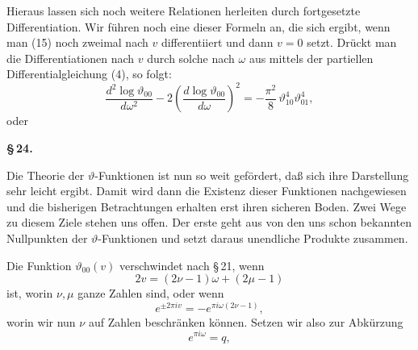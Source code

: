 
Hieraus lassen sich noch weitere Relationen herleiten durch fortgesetzte Differentiation. Wir führen noch eine dieser Formeln an, die sich ergibt, wenn man (15) noch zweimal nach $v$ differentiiert und dann $v=0$ setzt. Drückt man die Differentiationen nach $v$ durch solche nach $\omega$ aus mittels der partiellen Differentialgleichung (4), so folgt:
\[
\frac{d^2\log\vartheta_{00}}{d\omega^2} - 2\left(\frac{d\log\vartheta_{00}}{d\omega}\right)^2 = -\frac{\pi^2}{8}\,\vartheta_{10}^4\vartheta_{01}^4,
\]
oder

\begin{center}
\textbf{\S\,24. }\\
\textbf{}
\end{center}

Die Theorie der $\vartheta$-Funktionen ist nun so weit gefördert, daß sich ihre Darstellung sehr leicht ergibt. Damit wird dann die Existenz dieser Funktionen nachgewiesen und die bisherigen Betrachtungen erhalten erst ihren sicheren Boden. Zwei Wege zu diesem Ziele stehen uns offen. Der erste geht aus von den uns schon bekannten Nullpunkten der $\vartheta$-Funktionen und setzt daraus unendliche Produkte zusammen.

Die Funktion $\vartheta_{00}(v)$ verschwindet nach \S\,21, wenn
\[
2v = (2\nu-1)\omega + (2\mu-1)
\]
ist, worin $\nu, \mu$ ganze Zahlen sind, oder wenn
\[
e^{\pm 2\pi i v} = -e^{\pi i \omega(2\nu-1)},
\]
worin wir nun $\nu$ auf  Zahlen beschränken können. Setzen wir also zur Abkürzung
\[
e^{\pi i \omega} = q,
\]
